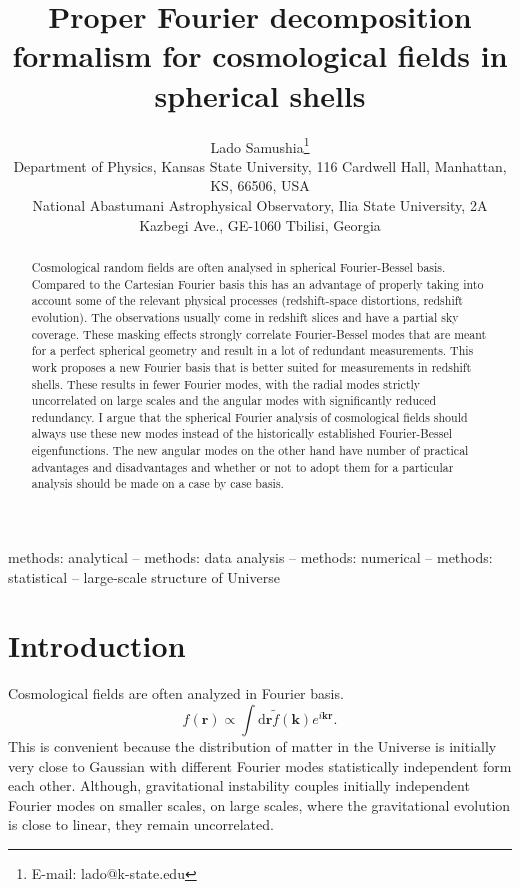 \documentclass[fleqn,usenatbib]{mnras}
\title[Basis for spherical shells]{Proper Fourier decomposition formalism for
cosmological fields in spherical shells}
\author[Lado Samushia]{
Lado Samushia\thanks{E-mail: lado@k-state.edu}
\\
Department of Physics, Kansas State University, 116 Cardwell Hall,
Manhattan, KS, 66506, USA\\
National Abastumani Astrophysical Observatory, Ilia State University,
2A Kazbegi Ave., GE-1060 Tbilisi, Georgia\\
}
\begin{document}
\label{firstpage}
\pagerange{\pageref{firstpage}--\pageref{lastpage}}
\maketitle

\begin{abstract}
Cosmological random fields are often analysed in spherical Fourier-Bessel
basis. Compared to the Cartesian Fourier basis this has an advantage of
properly taking into account some of the relevant physical processes
(redshift-space distortions, redshift evolution). The observations usually come
in redshift slices and have a partial sky coverage. These masking effects
strongly correlate Fourier-Bessel modes that are meant for a perfect spherical
geometry and result in a lot of redundant measurements. This work proposes a
new Fourier basis that is better suited for measurements in redshift shells.
These results in fewer Fourier modes, with the radial modes strictly
uncorrelated on large scales and the angular modes with significantly reduced
redundancy. I argue that the spherical Fourier analysis of cosmological fields
should always use these new modes instead of the historically established
Fourier-Bessel eigenfunctions. The new angular modes on the other hand have
number of practical advantages and disadvantages and whether or not to adopt
them for a particular analysis should be made on a case by case basis.
\end{abstract}

\begin{keywords}
methods: analytical -- methods: data analysis -- methods: numerical -- methods:
statistical -- large-scale structure of Universe
\end{keywords}



\section{Introduction}

Cosmological fields are often analyzed in Fourier basis. 
\begin{equation}
\label{eq:Finfinity}
f(\bm{r})\propto \displaystyle\int\!\!\mathrm{d}\bm{r}
\tilde{f}(\bm{k})e^{i\bm{k}\bm{r}}.
\end{equation}
\noindent
This is convenient because the distribution of matter in the Universe is
initially very close to Gaussian with different Fourier modes statistically
independent form each other. Although, gravitational instability couples
initially independent Fourier modes on smaller scales, on large scales, where
the gravitational evolution is close to linear, they remain uncorrelated.
\end{document}

